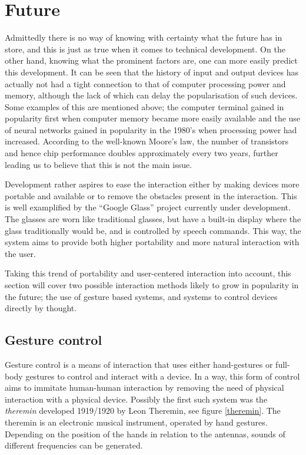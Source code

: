 
\section{Future}
\label{future}
Admittedly there is no way of knowing with certainty what the future has in store, and this is just as true when it comes to technical development. On the other hand, knowing what the prominent factors are, one can more easily predict this development. It can be seen that the history of input and output devices has actually not had a tight connection to that of computer processing power and memory, although the lack of which can delay the popularisation of such devices. Some examples of this are mentioned above; the computer terminal gained in popularity first when computer memory became more easily available and the use of neural networks gained in popularity in the 1980's when processing power had increased. According to the well-known Moore's law, the number of transistors and hence chip performance doubles approximately every two years, further leading us to believe that this is not the main issue.

Development rather aspires to ease the interaction either by making devices more portable and available or to remove the obstacles present in the interaction. This is well examplified by the ``Google Glass'' project currently under development. The glasses are worn like traditional glasses, but have a built-in display where the glass traditionally would be, and is controlled by speech commands. This way, the system aims to provide both higher portability and more natural interaction with the user.

Taking this trend of portability and user-centered interaction into account, this section will cover two possible interaction methods likely to grow in popularity in the future; the use of gesture based systems, and systems to control devices directly by thought. 


\subsection{Gesture control}
Gesture control is a means of interaction that uses either hand-gestures or full-body gestures to control and interact with a device. In a way, this form of control aims to immitate human-human interaction by removing the need of physical interaction with a physical device. Possibly the first such system was the \emph{theremin} developed 1919/1920 by Leon Theremin, see figure \ref{theremin}. The theremin is an electronic musical instrument, operated by hand gestures. Depending on the position of the hands in relation to the antennas, sounds of different frequencies can be generated\cite{thereminpatent}.

